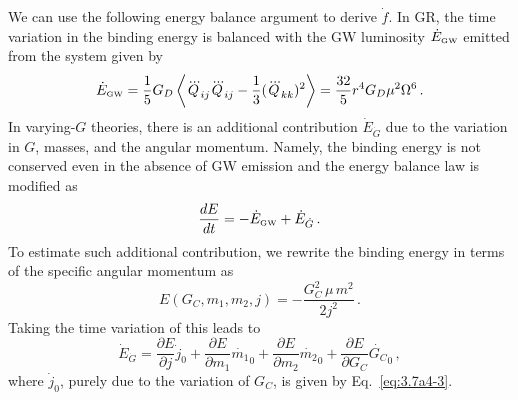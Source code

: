 \documentclass[prd,twocolumn,nofootinbib]{revtex4-1}
\newcommand{\GW}{{\mbox{\tiny GW}}}
\begin{document}
We can use the following energy balance argument to derive $\dot f$. 
In GR, the time variation in the binding energy is balanced with the GW luminosity $\dot{E}_{\GW}$ emitted from the system given by
 \begin{equation}\label{eq:3.7h}
 \dot{E}_{\GW}=\frac{1}{5}G_D\left \langle\dddot{Q}_{ij}\dddot{Q}_{ij}-\frac{1}{3}(\dddot{Q}_{kk})^2\right \rangle=\frac{32}{5} r^4 G_D \mu ^2 \Omega ^6\,.
 \end{equation}
In varying-$G$ theories, there is an additional contribution $\dot E_{\dot G}$ due to the variation in $G$, masses, and the angular momentum. Namely, the binding energy is not conserved even in the absence of GW emission and the energy balance law is modified as
\begin{equation}
\label{eq:3.7g}
\frac{d E}{d t}=-\dot{E}_{\GW} + \dot E_{\dot G}\,.
\end{equation}
%
 To estimate such additional contribution, we rewrite the binding energy in terms of the specific angular momentum as
 \begin{equation}\label{eq:3.7f}
 E(G_C,m_1,m_2,j)=-\frac{G_C^2\, \mu \, m^2}{2 j^2}\,.
 \end{equation}
Taking the time variation of this leads to
\begin{equation}
\label{eq:EGdot}
\dot E_{\dot G}=\frac{\partial E}{\partial j}\dot{j}_0+\frac{\partial E}{\partial m_1}\dot{m_1}_0+\frac{\partial E}{\partial m_2}\dot{m_2}_0+\frac{\partial E}{\partial G_C}\dot{G_C}_0\,,
 \end{equation}
where $\dot{j}_0$, purely due to the variation of $G_C$, is given by Eq.~\eqref{eq:3.7a4-3}. 

\end{document}
